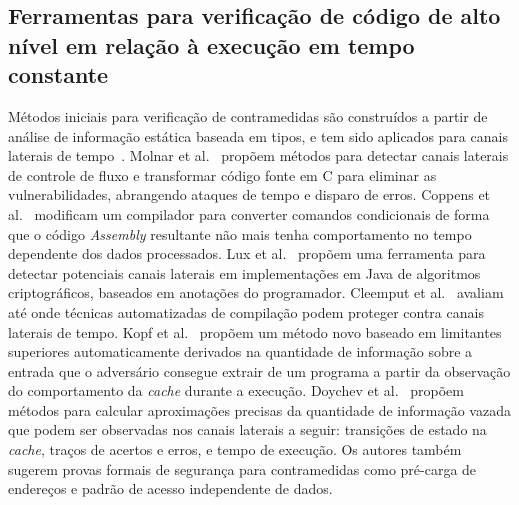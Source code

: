 
\subsection{Ferramentas para verificação de código de alto nível em relação à execução em tempo constante}

Métodos iniciais para verificação de contramedidas são construídos a partir de análise de informação estática baseada em tipos, e tem sido aplicados para
canais laterais de tempo~\cite{MolnarPiotrowskiSchultz:2006, SP:CVDD09, LuxMantelPerner:2010, LuxStarostin:2011}.
Molnar et al.~\cite{MolnarPiotrowskiSchultz:2006} propõem métodos para detectar canais laterais de controle de fluxo e transformar código fonte em C para eliminar as vulnerabilidades, abrangendo ataques de tempo e disparo de erros. Coppens et al.~\cite{SP:CVDD09} modificam um compilador para converter comandos condicionais de forma que o código \emph{Assembly} resultante não mais tenha comportamento no tempo dependente dos dados processados.
Lux et al.~\cite{LuxMantelPerner:2010, LuxStarostin:2011}
propõem uma ferramenta para detectar potenciais canais laterais em
implementações em Java de algoritmos criptográficos, baseados em anotações do programador.
Cleemput et al.~\cite{Cleemput:2012:CMT:2086696.2086702} avaliam até onde
técnicas automatizadas de compilação podem proteger contra canais laterais de tempo.
Kopf et al.~\cite{kopf2012automatic} propõem um método novo baseado em limitantes superiores
automaticamente derivados na quantidade de informação sobre a entrada que o adversário consegue
extrair de um programa a partir da observação do comportamento da \emph{cache} durante a execução.
Doychev et al.~\cite{doychev2013cacheaudit} propõem métodos para calcular
aproximações precisas da quantidade de informação vazada que podem ser observadas
nos canais laterais a seguir: transições de estado na \emph{cache}, traços de acertos e erros,
e tempo de execução. Os autores também sugerem provas formais de segurança para contramedidas
como pré-carga de endereços e padrão de acesso independente de dados.

